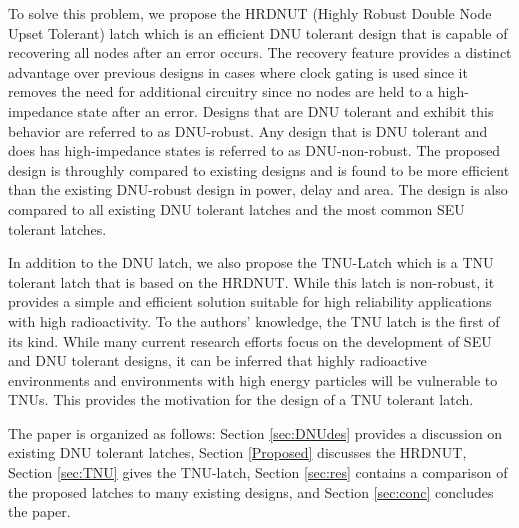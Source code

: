 To solve this problem, we propose the HRDNUT (Highly Robust Double Node Upset Tolerant) latch which is an efficient DNU tolerant design that is capable of recovering all nodes after an error occurs. The recovery feature provides a distinct advantage over previous designs in cases where clock gating is used since it removes the need for additional circuitry since no nodes are held to a high-impedance state after an error. Designs that are DNU tolerant and exhibit this behavior are referred to as DNU-robust. Any design that is DNU tolerant and does has high-impedance states is referred to as DNU-non-robust. The proposed design is throughly compared to existing designs and is found to be more efficient than the existing DNU-robust design \cite{DONUT} in power, delay and area. The design is also compared to all existing DNU tolerant latches and the most common SEU tolerant latches.

In addition to the DNU latch, we also propose the  TNU-Latch which is a TNU tolerant latch that is based on the HRDNUT. While this latch is non-robust, it provides a simple and efficient solution suitable for high reliability applications with high radioactivity. To the authors' knowledge, the TNU latch is the first of its kind. While many current research efforts focus on the development of SEU and DNU tolerant designs, it can be inferred that highly radioactive environments and environments with high energy particles will be vulnerable to TNUs. This provides the motivation for the design of a TNU tolerant latch.

The paper is organized as follows: Section \ref{sec:DNUdes} provides a discussion on existing DNU tolerant latches, Section \ref{Proposed} discusses the HRDNUT, Section \ref{sec:TNU} gives the TNU-latch, Section \ref{sec:res} contains a comparison of the proposed latches to many existing designs, and Section \ref{sec:conc} concludes the paper.